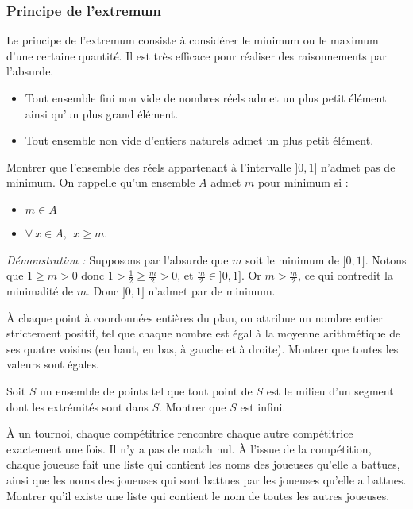 \subsubsection{Principe de l'extremum}
Le principe de l'extremum consiste à considérer le minimum ou le maximum d’une certaine quantité. Il est très efficace pour réaliser des raisonnements par l’absurde.

\begin{thm}
\begin{itemize}
    \item Tout ensemble fini non vide de nombres réels admet un plus petit élément ainsi qu’un plus grand élément.
    \item Tout ensemble non vide d'entiers naturels admet un plus petit élément.
\end{itemize}
\end{thm}


\begin{ex}
Montrer que l'ensemble des réels appartenant à l'intervalle $]0,1]$ n'admet pas de minimum. \newline
On rappelle qu'un ensemble $A$ admet $m$ pour minimum si :
\begin{itemize}
\item $m\in A$
\item $\forall~ x\in A, ~~ x\geq m$.
\end{itemize}
\bigskip
\noindent\textit{Démonstration :} Supposons par l'absurde que $m$ soit le minimum de $]0,1]$. \newline
Notons que $1\geq m>0$ donc $1>\frac12\geq\frac{m}{2}>0$, et $\frac{m}{2}\in]0,1]$. Or $m>\frac{m}{2}$, ce qui contredit la minimalité de $m$. Donc $]0,1]$ n'admet par de minimum.
\end{ex}


\begin{exo}
À chaque point à coordonnées entières du plan, on attribue un nombre entier strictement positif, tel que chaque nombre est égal à la moyenne arithmétique de ses quatre voisins
(en haut, en bas, à gauche et à droite). Montrer que toutes les valeurs sont égales.
\end{exo}


\begin{exo}
Soit $S$ un ensemble de points tel que tout point de $S$ est le milieu d’un segment dont les extrémités sont dans $S$. Montrer que $S$ est infini.
\end{exo}


\begin{exo}
À un tournoi, chaque compétitrice rencontre chaque autre compétitrice exactement une fois. Il n’y a pas de match nul. À l’issue de la compétition, chaque joueuse fait une liste qui contient les noms des joueuses qu’elle a battues, ainsi que les noms des joueuses qui sont battues par les joueuses qu’elle a battues.
\newline
Montrer qu’il existe une liste qui contient le nom de toutes les autres joueuses.
\end{exo}

